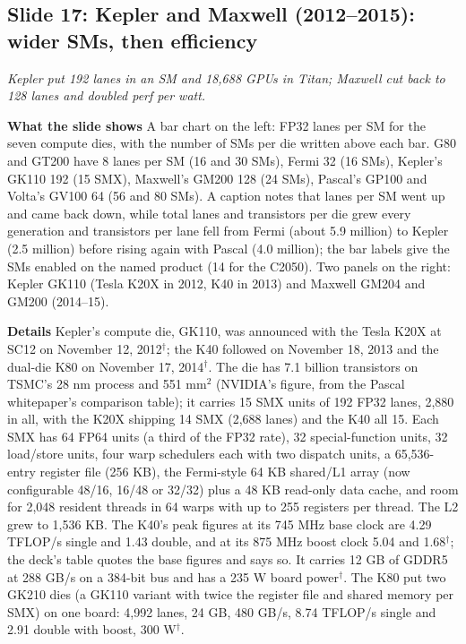 \documentclass[11pt,letterpaper]{article}
\newcommand{\slide}[3]{%
  \subsection[Slide #1: #2]{Slide #1: #2}%
  {\color{muted}\itshape #3\par}\medskip}
\newcommand{\para}[1]{\medskip\noindent\textbf{#1}\quad}
\begin{document}
\slide{17}{Kepler and Maxwell (2012--2015): wider SMs, then efficiency}{Kepler put 192 lanes in an SM and 18,688 GPUs in Titan; Maxwell cut back to 128 lanes and doubled perf per watt.}

\para{What the slide shows} A bar chart on the left: FP32 lanes per SM for the seven compute dies, with the number of SMs per die written above each bar. G80 and GT200 have 8 lanes per SM (16 and 30 SMs), Fermi 32 (16 SMs), Kepler's GK110 192 (15 SMX), Maxwell's GM200 128 (24 SMs), Pascal's GP100 and Volta's GV100 64 (56 and 80 SMs). A caption notes that lanes per SM went up and came back down, while total lanes and transistors per die grew every generation and transistors per lane fell from Fermi (about 5.9 million) to Kepler (2.5 million) before rising again with Pascal (4.0 million); the bar labels give the SMs enabled on the named product (14 for the C2050). Two panels on the right: Kepler GK110 (Tesla K20X in 2012, K40 in 2013) and Maxwell GM204 and GM200 (2014--15).

\para{Details} Kepler's compute die, GK110, was announced with the Tesla K20X at SC12 on November 12, 2012$^\dagger$; the K40 followed on November 18, 2013 and the dual-die K80 on November 17, 2014$^\dagger$. The die has 7.1 billion transistors on TSMC's 28 nm process and 551 mm$^2$ (NVIDIA's figure, from the Pascal whitepaper's comparison table); it carries 15 SMX units of 192 FP32 lanes, 2,880 in all, with the K20X shipping 14 SMX (2,688 lanes) and the K40 all 15. Each SMX has 64 FP64 units (a third of the FP32 rate), 32 special-function units, 32 load/store units, four warp schedulers each with two dispatch units, a 65,536-entry register file (256 KB), the Fermi-style 64 KB shared/L1 array (now configurable 48/16, 16/48 or 32/32) plus a 48 KB read-only data cache, and room for 2,048 resident threads in 64 warps with up to 255 registers per thread. The L2 grew to 1,536 KB. The K40's peak figures at its 745 MHz base clock are 4.29 TFLOP/s single and 1.43 double, and at its 875 MHz boost clock 5.04 and 1.68$^\dagger$; the deck's table quotes the base figures and says so. It carries 12 GB of GDDR5 at 288 GB/s on a 384-bit bus and has a 235 W board power$^\dagger$. The K80 put two GK210 dies (a GK110 variant with twice the register file and shared memory per SMX) on one board: 4,992 lanes, 24 GB, 480 GB/s, 8.74 TFLOP/s single and 2.91 double with boost, 300 W$^\dagger$.
\end{document}
